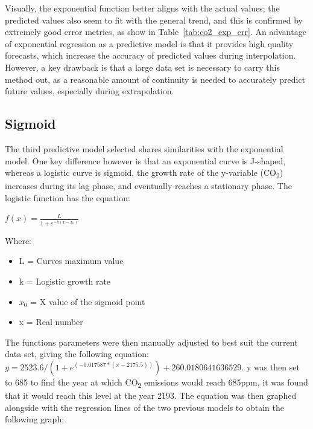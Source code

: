 \documentclass{mcmthesis}
\begin{document}
    Visually, the exponential function better aligns with the actual values; the predicted values also seem to fit with the general trend, and this is confirmed by extremely good error metrics, as show in Table~\ref{tab:co2_exp_err}.
    An advantage of exponential regression as a predictive model is that it provides high quality forecasts, which increase the accuracy of predicted values during interpolation.
    However, a key drawback is that a large data set is necessary to carry this method out, as a reasonable amount of continuity is needed to accurately predict future values, especially during extrapolation.

    \subsection{Sigmoid}
    The third predictive model selected shares similarities with the exponential model.
    One key difference however is that an exponential curve is J-shaped, whereas a logistic curve is sigmoid, the growth rate of the y-variable (CO\textsubscript{2}) increases during its lag phase, and eventually reaches a stationary phase.
    The logistic function has the equation:

    ${\displaystyle f(x)={\frac {L}{1+e^{-k(x-x_{0})}}}}$

    Where:
    \begin{itemize}
        \item {L} = Curve\textquotesingle s maximum value
        \item {k} = Logistic growth rate
        \item ${x_0}$ = X value of the sigmoid point
        \item {x} = Real number
    \end{itemize}

    The function\textquotesingle s parameters were then manually adjusted to best suit the current data set, giving the following equation: ${y = 2523.6 / (1 + e^{(-0.017587 * (x - 2175.5))}) + 260.0180641636529}$. {y} was then set to 685 to find the year at which CO\textsubscript{2} emissions would reach 685ppm, it was found that it would reach this level at the year 2193. The equation was then graphed alongside with the regression lines of the two previous models to obtain the following graph:
\end{document}
